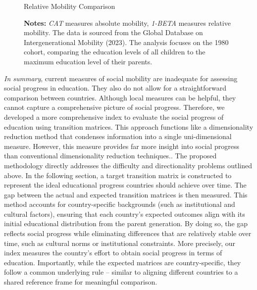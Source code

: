 \begin{figure}[!ht]
    \centering
    \caption{Relative Mobility Comparison}
    \label{fig:compare2}
    \captionsetup{font=footnotesize}
    \caption*{\textbf{Notes:} \textit{CAT} measures absolute mobility, \textit{1-BETA} measures relative mobility. The data is sourced from the Global Database on Intergenerational Mobility (2023). The analysis focuses on the 1980 cohort, comparing the education levels of all children to the maximum education level of their parents.}
\end{figure} 

\textit{In summary}, current measures of social mobility are inadequate for assessing social progress in education. They also do not allow for a straightforward comparison between countries. Although local measures can be helpful, they cannot capture a comprehensive picture of social progress. Therefore, we developed a more comprehensive index to evaluate the social progress of education using transition matrices. This approach functions like a dimensionality reduction method that condenses information into a single uni-dimensional measure. However, this measure provides far more insight into social progress than conventional dimensionality reduction techniques.. The proposed methodology directly addresses the difficulty and directionality problems outlined above. In the following section, a target transition matrix is constructed to represent the ideal educational progress countries should achieve over time. The gap between the actual and expected transition matrices is then measured. This method accounts for country-specific backgrounds (such as institutional and cultural factors), ensuring that each country’s expected outcomes align with its initial educational distribution from the parent generation. By doing so, the gap reflects social progress while eliminating differences that are relatively stable over time, such as cultural norms or institutional constraints. More precisely, our index measures the country's effort to obtain social progress in terms of education. Importantly, while the expected matrices are country-specific, they follow a common underlying rule -- similar to aligning different countries to a shared reference frame for meaningful comparison.

